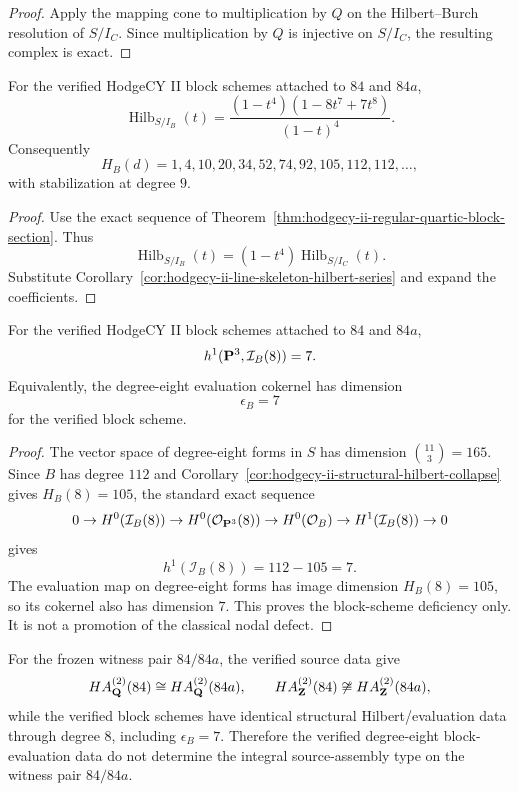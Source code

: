 \begin{proof}
Apply the mapping cone to multiplication by \(Q\) on the
Hilbert--Burch resolution of \(S/I_C\).  Since multiplication by \(Q\)
is injective on \(S/I_C\), the resulting complex is exact.
\end{proof}

\begin{corollary}\label{cor:hodgecy-ii-structural-hilbert-collapse}
For the verified HodgeCY II block schemes attached to \(84\) and
\(84a\),
\[
  \operatorname{Hilb}_{S/I_B}(t)
  =
  \frac{(1-t^4)(1-8t^7+7t^8)}{(1-t)^4}.
\]
Consequently
\[
  H_B(d)=1,4,10,20,34,52,74,92,105,112,112,\ldots,
\]
with stabilization at degree \(9\).
\end{corollary}

\begin{proof}
Use the exact sequence of
Theorem~\ref{thm:hodgecy-ii-regular-quartic-block-section}.  Thus
\[
  \operatorname{Hilb}_{S/I_B}(t)
  =(1-t^4)\operatorname{Hilb}_{S/I_C}(t).
\]
Substitute Corollary~\ref{cor:hodgecy-ii-line-skeleton-hilbert-series}
and expand the coefficients.
\end{proof}

\begin{corollary}\label{cor:hodgecy-ii-degree-eight-deficiency}
For the verified HodgeCY II block schemes attached to \(84\) and
\(84a\),
\[
  h^1({\bf P}^3,\mathcal I_B(8))=7.
\]
Equivalently, the degree-eight evaluation cokernel has dimension
\[
  \epsilon_B=7
\]
for the verified block scheme.
\end{corollary}

\begin{proof}
The vector space of degree-eight forms in \(S\) has dimension
\(\binom{11}{3}=165\).  Since \(B\) has degree \(112\) and
Corollary~\ref{cor:hodgecy-ii-structural-hilbert-collapse} gives
\(H_B(8)=105\), the standard exact sequence
\[
0\to H^0(\mathcal I_B(8))\to H^0(\mathcal O_{{\bf P}^3}(8))
\to H^0(\mathcal O_B)\to H^1(\mathcal I_B(8))\to 0
\]
gives
\[
  h^1(\mathcal I_B(8))=112-105=7.
\]
The evaluation map on degree-eight forms has image dimension
\(H_B(8)=105\), so its cokernel also has dimension \(7\).
This proves the block-scheme deficiency only.  It is not a promotion
of the classical nodal defect.
\end{proof}

\begin{proposition}\label{prop:hodgecy-ii-nondetermination}
For the frozen witness pair \(84/84a\), the verified source data give
\[
  HA_{\bf Q}^{(2)}(84)\cong HA_{\bf Q}^{(2)}(84a),
  \qquad
  HA_{\bf Z}^{(2)}(84)\not\cong HA_{\bf Z}^{(2)}(84a),
\]
while the verified block schemes have identical structural
Hilbert/evaluation data through degree \(8\), including
\(\epsilon_B=7\).  Therefore the verified degree-eight block-evaluation
data do not determine the integral source-assembly type on the witness
pair \(84/84a\).
\end{proposition}

